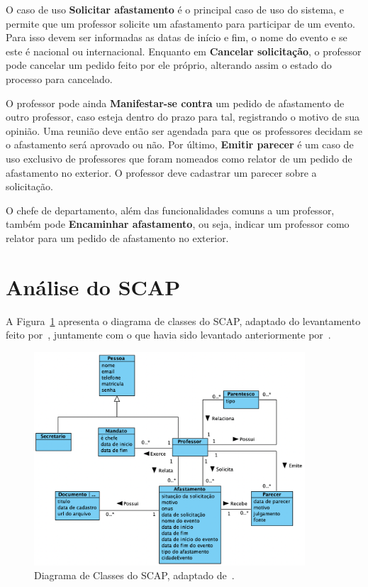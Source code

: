 O caso de uso \textbf{Solicitar afastamento} é o principal caso de uso do sistema, e permite
que um professor solicite um afastamento para participar de um evento. Para isso devem ser informadas
as datas de início e fim, o nome do evento e se este é nacional ou internacional. 
Enquanto em \textbf{Cancelar solicitação}, o professor pode cancelar um pedido feito por ele próprio,
alterando assim o estado do processo para cancelado.

O professor pode ainda \textbf{Manifestar-se contra} um pedido de afastamento de 
outro professor, caso esteja dentro do prazo para tal, registrando o motivo de sua opinião.
Uma reunião deve então ser agendada para que os professores decidam se o afastamento será aprovado ou não.
Por último, \textbf{Emitir parecer} é um caso de uso exclusivo de professores que foram nomeados
como relator de um pedido de afastamento no exterior. O professor deve cadastrar um parecer sobre a solicitação.

O chefe de departamento, além das funcionalidades comuns a um professor, também pode \textbf{Encaminhar afastamento},
ou seja, indicar um professor como relator para um pedido de afastamento no exterior. 


\section{Análise do SCAP}
\label{sec-espec-analise-scap}

A Figura~\ref{fig:diagrama-classes} apresenta o diagrama de classes do SCAP, adaptado
do levantamento feito por~, juntamente com o que havia sido
levantado anteriormente por~.

\begin{figure}[h!]
    \centering  
    \includegraphics[width=0.9\textwidth]{figuras/fig-diagrama-classes.png}
    \caption{Diagrama de Classes do SCAP, adaptado de~\cite{prado:2015}.}
    \label{fig:diagrama-classes}
\end{figure}

